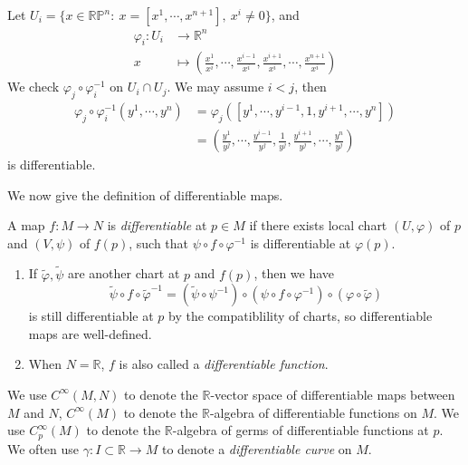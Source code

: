 \begin{eg}
\begin{enumerate}[(1)]
        Let $U_i=\{x\in\mathbb{RP}^n:\ x=[x^1,\cdots,x^{n+1}],\ x^i\neq 0\}$, and
        \begin{align*}
            \varphi_i:U_i&\to\mathbb{R}^n\\
            x&\mapsto\left(\frac{x^1}{x^i},\cdots,\frac{x^{i-1}}{x^i},\frac{x^{i+1}}{x^i},\cdots,\frac{x^{n+1}}{x^i}\right)
        \end{align*}
        We check $\varphi_j\circ\varphi_i^{-1}$ on $U_i\cap U_j$.
        We may assume $i<j$, then
        \begin{align*}
            \varphi_j\circ\varphi_i^{-1}(y^1,\cdots,y^n)&=\varphi_j\left([y^1,\cdots,y^{i-1},1,y^{i+1},\cdots,y^n]\right)\\
            &=\left(\frac{y^1}{y^j},\cdots,\frac{y^{i-1}}{y^j},\frac{1}{y^j},\frac{y^{i+1}}{y^j},\cdots,\frac{y^n}{y^j}\right)
        \end{align*}
        is differentiable.
    \end{enumerate}
\end{eg}

We now give the definition of differentiable maps.
\begin{defn}
    A map $f:M\to N$ is \emph{differentiable} at $p\in M$ if there exists local chart $(U,\varphi)$ of $p$ and $(V,\psi)$ of $f(p)$, such that $\psi\circ f\circ\varphi^{-1}$ is differentiable at $\varphi(p)$.
\end{defn}

\begin{rem}
    \begin{enumerate}[(1)]
        \item If $\tilde{\varphi},\tilde{\psi}$ are another chart at $p$ and $f(p)$, then we have
        \[\tilde{\psi}\circ f\circ\tilde{\varphi}^{-1}=(\tilde{\psi}\circ\psi^{-1})\circ(\psi\circ f\circ\varphi^{-1})\circ(\varphi\circ\tilde{\varphi})\]
        is still differentiable at $p$ by the compatiblility of charts, so differentiable maps are well-defined.
        \item When $N=\mathbb{R}$, $f$ is also called a \emph{differentiable function}. 
    \end{enumerate}
\end{rem}

\begin{symb}
    We use $C^\infty(M,N)$ to denote the $\mathbb{R}$-vector space of differentiable maps between $M$ and $N$,
    $C^\infty(M)$ to denote the $\mathbb{R}$-algebra of differentiable functions on $M$.
    We use $C^\infty_p(M)$ to denote the $\mathbb{R}$-algebra of germs of differentiable functions at $p$.
    We often use $\gamma:I\subset\mathbb{R}\to M$ to denote a \emph{differentiable curve} on $M$.
\end{symb}

